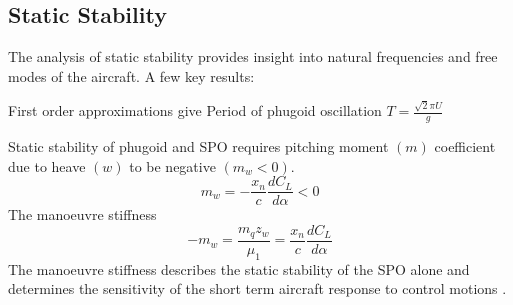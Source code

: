\documentclass{article}
\begin{document}
\subsection{Static Stability}

The analysis of static stability provides insight into natural frequencies and free modes of the aircraft.
A few key results:

First order approximations give
Period of phugoid oscillation $T = \frac{\sqrt{2} \pi U}{g}$

Static stability of phugoid and SPO requires pitching moment $(m)$ coefficient due to heave $(w)$ to be negative $(m_w < 0)$.
\begin{equation}
    m_w = -\frac{x_n}{c}\frac{dC_L}{d\alpha} < 0
\end{equation}
The manoeuvre stiffness
\begin{equation}
    -m_w = \frac{m_q z_w}{\mu_1} = \frac{x_n}{c}\frac{dC_L}{d\alpha} 
\end{equation}
The manoeuvre stiffness describes the static stability of the SPO alone and determines the sensitivity of the short term aircraft response to control motions \cite{handout}.
\end{document}
